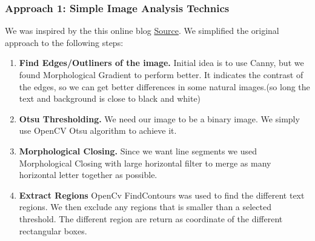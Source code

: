 \documentclass[Report.tex]{subfiles}
\begin{document}
\begin{flushleft}
  \subsubsection{Approach 1: Simple Image Analysis Technics}
  We was inspired by the this online blog \href{https://www.danvk.org/2015/01/07/finding-blocks-of-text-in-an-image-using-python-opencv-and-numpy.html}{Source}\cite{_finding_????}. We simplified the original approach to the following steps:
  \begin{enumerate}
    \item \textbf{Find Edges/Outliners of the image.}
    Initial idea is to use Canny, but we found Morphological Gradient to perform better. It indicates the contrast of the edges, so we can get better differences in some natural images.(so long the text and background is close to black and white)
    \item \textbf{Otsu Thresholding.}
    We need our image to be a binary image. We simply use OpenCV Otsu algorithm to achieve it.
    \item \textbf{Morphological Closing.}
    Since we want line segments we used Morphological Closing with large horizontal filter to merge as many horizontal letter together as possible.
    \item \textbf{Extract Regions}
    OpenCv FindContours was used to find the different text regions. We then exclude any regions that is smaller than a selected threshold. The different region are return as coordinate of the different rectangular boxes.
  \end{enumerate}
\end{flushleft}
\end{document}

